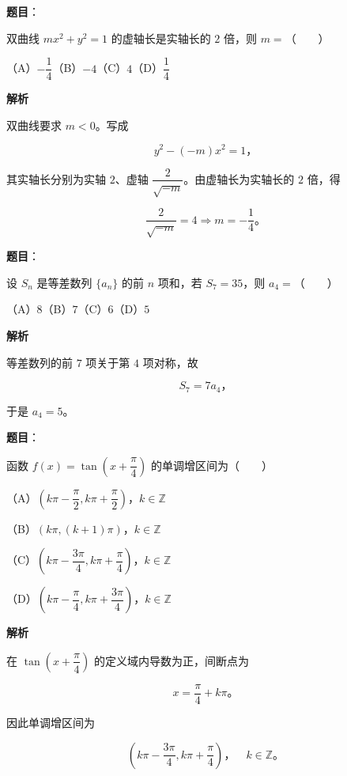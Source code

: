 \begin{answer}

\textbf{题目}：

双曲线 $mx^2+y^2=1$ 的虚轴长是实轴长的 $2$ 倍，则 $m=$\mbox{（　　）}

（A）$-\dfrac14$\quad（B）$-4$\quad（C）$4$\quad（D）$\dfrac14$

\textbf{解析}

双曲线要求 $m<0$。写成

\nopagebreak[4]
\[
y^2-(-m)x^2=1\text{，}
\]

其实轴长分别为实轴 $2$、虚轴 $\dfrac{2}{\sqrt{-m}}$。由虚轴长为实轴长的 $2$ 倍，得

\nopagebreak[4]
\[
\frac{2}{\sqrt{-m}}=4\Longrightarrow m=-\frac14\text{。}
\]


\end{answer}
\begin{answer}

\textbf{题目}：

设 $S_n$ 是等差数列 $\{a_n\}$ 的前 $n$ 项和，若 $S_7=35$，则 $a_4=$\mbox{（　　）}

（A）$8$\quad（B）$7$\quad（C）$6$\quad（D）$5$

\textbf{解析}

等差数列的前 $7$ 项关于第 $4$ 项对称，故

\nopagebreak[4]
\[
S_7=7a_4\text{，}
\]

于是 $a_4=5$。


\end{answer}
\begin{answer}

\textbf{题目}：

函数 $f(x)=\tan\left(x+\dfrac\pi4\right)$ 的单调增区间为\mbox{（　　）}

（A）$\left(k\pi-\dfrac\pi2,k\pi+\dfrac\pi2\right)$，$k\in\mathbb Z$

（B）$(k\pi,(k+1)\pi)$，$k\in\mathbb Z$

（C）$\left(k\pi-\dfrac{3\pi}4,k\pi+\dfrac\pi4\right)$，$k\in\mathbb Z$

（D）$\left(k\pi-\dfrac\pi4,k\pi+\dfrac{3\pi}4\right)$，$k\in\mathbb Z$

\textbf{解析}

在 $\tan\left(x+\dfrac\pi4\right)$ 的定义域内导数为正，间断点为

\nopagebreak[4]
\[
x=\frac\pi4+k\pi\text{。}
\]

因此单调增区间为

\nopagebreak[4]
\[
\left(k\pi-\frac{3\pi}4,k\pi+\frac\pi4\right)\text{，}\quad k\in\mathbb Z\text{。}
\]


\end{answer}
